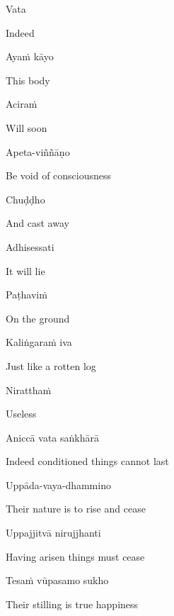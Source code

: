 Vata

\begin{english}
  Indeed
\end{english}

Ayaṁ kāyo

\begin{english}
  This body
\end{english}

Aciraṁ

\begin{english}
  Will soon
\end{english}

Apeta-viññāṇo

\begin{english}
  Be void of consciousness
\end{english}

Chuḍḍho

\begin{english}
  And cast away
\end{english}

Adhisessati

\begin{english}
  It will lie
\end{english}

Paṭhaviṁ

\begin{english}
  On the ground
\end{english}

Kaliṅgaraṁ iva

\begin{english}
  Just like a rotten log
\end{english}

Niratthaṁ

\begin{english}
  Useless\ifdigitalversion\makeatletter\hyperlink{endnote105-appendix}\makeatother\fi
\end{english}

\suttaRef{[Dhp 41]}

Aniccā vata saṅkhārā

\begin{english}
  Indeed conditioned things cannot last
\end{english}

Uppāda-vaya-dhammino

\begin{english}
  Their nature is to rise and cease\ifdigitalversion\makeatletter\hyperlink{endnote106-appendix}\makeatother\fi
\end{english}

Uppajjitvā nirujjhanti

\begin{english}
  Having arisen things must cease
\end{english}

Tesaṁ vūpasamo sukho

\begin{english}
  Their stilling is true happiness
\end{english}

\suttaRef{[Trad]}

\ifdigitalversion{}\fi


